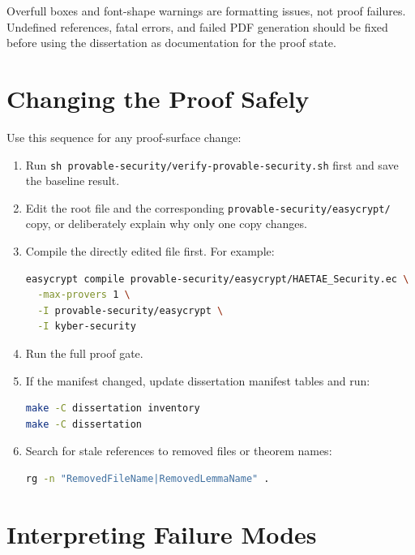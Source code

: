 \documentclass[11pt]{article}
\newcommand{\file}[1]{\nolinkurl{#1}}
\begin{document}
Overfull boxes and font-shape warnings are formatting issues, not proof
failures.  Undefined references, fatal errors, and failed PDF generation should
be fixed before using the dissertation as documentation for the proof state.

\section{Changing the Proof Safely}

Use this sequence for any proof-surface change:

\begin{enumerate}[leftmargin=*]
  \item Run \file{sh provable-security/verify-provable-security.sh} first and
  save the baseline result.
  \item Edit the root file and the corresponding
  \file{provable-security/easycrypt/} copy, or deliberately explain why only
  one copy changes.
  \item Compile the directly edited file first.  For example:
\begin{lstlisting}[language=bash]
easycrypt compile provable-security/easycrypt/HAETAE_Security.ec \
  -max-provers 1 \
  -I provable-security/easycrypt \
  -I kyber-security
\end{lstlisting}
  \item Run the full proof gate.
  \item If the manifest changed, update dissertation manifest tables and run:
\begin{lstlisting}[language=bash]
make -C dissertation inventory
make -C dissertation
\end{lstlisting}
  \item Search for stale references to removed files or theorem names:
\begin{lstlisting}[language=bash]
rg -n "RemovedFileName|RemovedLemmaName" .
\end{lstlisting}
\end{enumerate}

\section{Interpreting Failure Modes}
\end{document}
